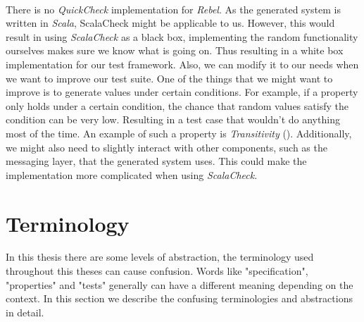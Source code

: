 \\
There is no \textit{QuickCheck} implementation for \textit{Rebel}. As the generated system is written in \textit{Scala}, ScalaCheck might be applicable to us. However, this would result in using \textit{ScalaCheck} as a black box, implementing the random functionality ourselves makes sure we know what is going on. Thus resulting in a white box implementation for our test framework. Also, we can modify it to our needs when we want to improve our test suite. One of the things that we might want to improve is to generate values under certain conditions. For example, if a property only holds under a certain condition, the chance that random values satisfy the condition can be very low. Resulting in a test case that wouldn't do anything most of the time. An example of such a property is \textit{Transitivity} ().%
Additionally, we might also need to slightly interact with other components, such as the messaging layer, that the generated system uses. This could make the implementation more complicated when using \textit{ScalaCheck}.

\section{Terminology}
In this thesis there are some levels of abstraction, the terminology used throughout this theses can cause confusion. Words like "specification", "properties" and "tests" generally can have a different meaning depending on the context. In this section we describe the confusing terminologies and abstractions in detail.

